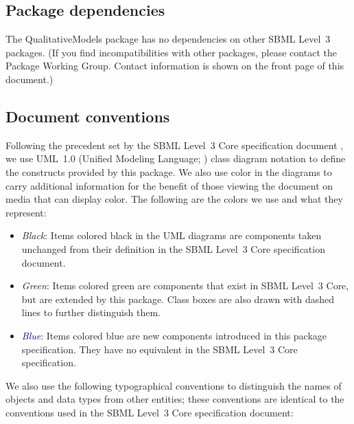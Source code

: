 \subsection{Package dependencies}

The QualitativeModels package has no dependencies on other
SBML Level~3 packages.  
(If you find incompatibilities with other packages, please contact the
Package Working Group.  Contact information is shown on the front page
of this document.)


\subsection{Document conventions}
\label{conventions}

Following the precedent set by the SBML Level~3 Core specification
document \citep{l3v1c}, we use UML~1.0 (Unified Modeling Language;
\citealt{eriksson:1998,oestereich:1999}) class diagram notation to
define the constructs provided by this package.  We also use color in
the diagrams to carry additional information for the benefit of those
viewing the document on media that can display color.  The following are
the colors we use and what they represent:

\begin{itemize}

\item[\raisebox{2.75pt}{\colorbox{black}{\rule{0.8pt}{0.8pt}}}]
  \emph{Black}: Items colored black in the UML diagrams are components
  taken unchanged from their definition in the SBML Level~3 Core
  specification document.

\item[\raisebox{2.75pt}{\colorbox{mediumgreen}{\rule{0.8pt}{0.8pt}}}]
  \emph{\textcolor{mediumgreen}{Green}}: Items colored green are
  components that exist in SBML Level~3 Core, but are extended by this
  package.  Class boxes are also drawn with dashed lines to further
  distinguish them.

\item[\raisebox{2.75pt}{\colorbox{darkblue}{\rule{0.8pt}{0.8pt}}}]
  \emph{\textcolor{darkblue}{Blue}}: Items colored blue are new
  components introduced in this package specification.  They have no
  equivalent in the SBML Level~3 Core specification.

\end{itemize}

We also use the following typographical conventions to distinguish the
names of objects and data types from other entities; these conventions
are identical to the conventions used in the SBML Level~3 Core specification
document:


